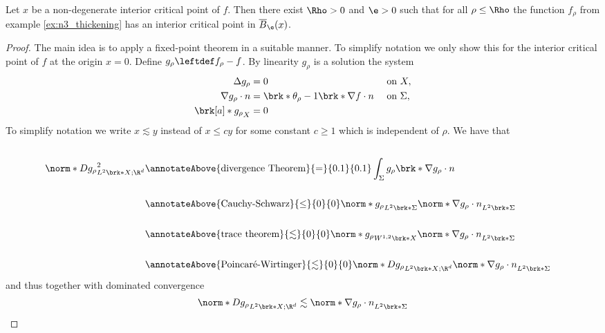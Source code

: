 \begin{proposition}\label{pr:n3_thickening_cp}
  Let $x$ be a non-degenerate interior critical point of $f$.
  Then there exist $\Rho>0$ and $\e>0$ such that for all $\rho\leq\Rho$ the function $f_\rho$ from example
  \ref{ex:n3_thickening} has an interior critical point in $\overline{B}_\e(x)$.
\end{proposition}
\begin{proof}
  The main idea is to apply a fixed-point theorem in a suitable manner.
  To simplify notation we only show this for the interior critical point of $f$ at the origin $x=0$.
  Define $g_\rho\leftdef f_\rho-f$.
  By linearity $g_\rho$ is a solution the system
  \begin{align*}
    \Delta g_\rho&=0 &&\text{ on }X, \\
    \nabla g_\rho\cdot n&=\brk*{\theta_\rho-1}\brk*{\nabla f\cdot n} &&\text{ on }\Sigma, \\
    \brk[a]*{g_\rho}_X&=0 &&
  \end{align*}
  To simplify notation we write $x\lesssim y$ instead of $x\leq cy$ for
  some constant $c\geq1$ which is independent of $\rho$.
  We have that
  \begin{align*}
    \\
    \norm*{Dg_\rho}_{L^2\brk*{X;\R^d}}^2
    &\annotateAbove{\text{divergence Theorem}}{=}{0.1}{0.1} \int_{\Sigma}g_\rho\brk*{\nabla g_\rho\cdot n} \\ \\
    &\annotateAbove{\text{Cauchy-Schwarz}}{\leq}{0}{0} \norm*{g_\rho}_{L^2\brk*{\Sigma}}\norm*{\nabla g_\rho\cdot n}_{L^2\brk*{\Sigma}} \\ \\
    &\annotateAbove{\text{trace theorem}}{\lesssim}{0}{0} \norm*{g_\rho}_{W^{1,2}\brk*{X}}\norm*{\nabla g_\rho\cdot n}_{L^2\brk*{\Sigma}} \\ \\
    &\annotateAbove{\text{Poincaré-Wirtinger}}{\lesssim}{0}{0} \norm*{Dg_\rho}_{L^2\brk*{X;\R^d}}\norm*{\nabla g_\rho\cdot n}_{L^2\brk*{\Sigma}}
  \end{align*}
  and thus together with dominated convergence
  \begin{align*}
    \norm*{Dg_\rho}_{L^2\brk*{X;\R^d}}\lesssim\norm*{\nabla g_\rho\cdot n}_{L^2\brk*{\Sigma}}

\end{align*}
\end{proof}

